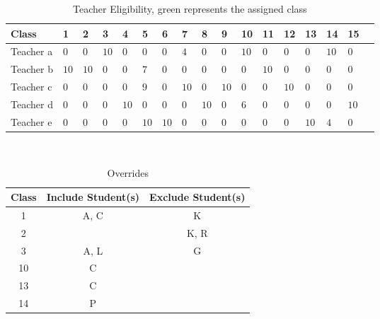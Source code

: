 \documentclass[11pt]{article}
\begin{document}
\begin{table}
\Huge
\hspace*{-4.25cm}
\begin{tabular}{|a|p{.7cm}|p{.7cm}|p{.7cm}|p{.7cm}|p{.7cm}|p{.7cm}|p{.7cm}|p{.7cm}|p{.7cm}|p{.7cm}|p{.7cm}|p{.7cm}|p{.7cm}|p{.7cm}|p{.7cm}|p{.7cm}|} \hline
Class & 1 & 2 & 3 & 4 & 5 & 6 & 7 & 8
& 9 & 10 & 11 & 12 & 13 & 14 & 15 \\ \hline
\hline

Teacher a & $0$ & $0$ & $10$ & $0$ & $0$ & $0$
& $4$ & $0$ & $0$ & $10$ & $0$ & $0$ & $0$
& $10$ & $0$ \\ \hline
Teacher b & $10$ & $10$ & $0$ & $0$ & $7$ & $0$
& $0$ & $0$ & $0$ & $0$ & $10$ & $0$ & $0$
& $0$ & $0$ \\ \hline
Teacher c & $0$ & $0$ & $0$ & $0$ & $9$ & $0$
& $10$ & $0$ & $10$ & $0$ & $0$ & $10$ & $0$
& $0$ & $0$ \\ \hline
Teacher d & $0$ & $0$ & $0$ & $10$ & $0$ & $0$
& $0$ & $10$ & $0$ & $6$ & $0$ & $0$ & $0$
& $0$ & $10$ \\ \hline
Teacher e & $0$ & $0$ & $0$ & $0$ & $10$ & $10$
& $0$ & $0$ & $0$ & $0$ & $0$ & $0$ & $10$
& $4$ & $0$ \\ \hline
\end{tabular}
\caption{Teacher Eligibility, green represents the assigned class}
\label{table:elig}
\end{table}


\begin{table}
\hspace*{-3cm}\
\Huge
\begin{tabular}{c|c|c}
Class  & Include Student(s) & Exclude Student(s) \\ \hline
1 & A, C & K \\
2 &   & K, R \\
3 & A, L & G \\
10 & C &   \\
13 & C &   \\
14 & P &   \\
\end{tabular}
\caption{Overrides}
\label{table:override}
\end{table}
\end{document}
